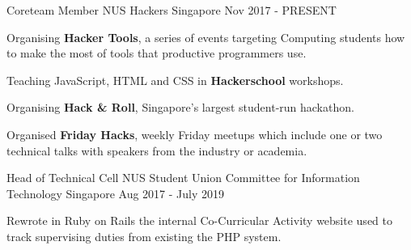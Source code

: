

\begin{cventries}

  \cventry
  {Coreteam Member} %
  {NUS Hackers} %
  {Singapore} %
  {Nov 2017 - PRESENT} %
  {
    \begin{cvitems} %
      \item {Organising \textbf{Hacker Tools}, a series of events targeting Computing students how to make the most of tools that productive programmers use.}
      \item {Teaching JavaScript, HTML and CSS in \textbf{Hackerschool} workshops.}
      \item {Organising \textbf{Hack \& Roll}, Singapore's largest student-run hackathon.}
      \item {Organised \textbf{Friday Hacks}, weekly Friday meetups which include one or two technical talks with speakers from the industry or academia.}
    \end{cvitems}
  }

  \cventry
  {Head of Technical Cell} %
  {NUS Student Union Committee for Information Technology} %
  {Singapore} %
  {Aug 2017 - July 2019} %
  {
    \begin{cvitems} %
      \item {Rewrote in Ruby on Rails the internal Co-Curricular Activity website used to track supervising duties from existing the PHP system.}
    \end{cvitems}
  }

\end{cventries}
